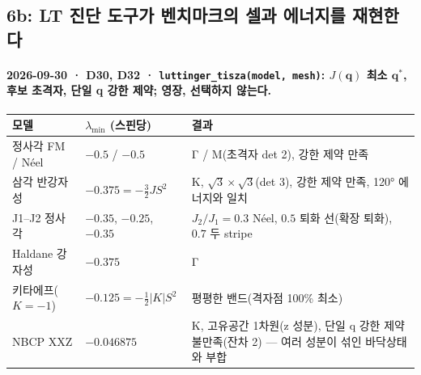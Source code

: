 \subsection{6b: LT 진단 도구가 벤치마크의 셀과 에너지를 재현한다}\label{stage6b}
\begingroup%
  \framesubtitle{2026-09-30 · D30, D32 · \texttt{luttinger\_tisza(model, mesh)}: $J(\mathbf q)$ 최소 $\mathbf q^*$, 후보 초격자, 단일 q 강한 제약; 영장, 선택하지 않는다.}
  \footnotesize\renewcommand{\arraystretch}{1.06}
  \begin{tabularx}{\textwidth}{@{}P{3.4cm}P{2.4cm}Y@{}}
    \toprule
    모델 & $\lambda_{\min}$ (스핀당) & 결과 \\
    \midrule
    정사각 FM / Néel & $-0.5$ / $-0.5$ & Γ / M(초격자 det 2), 강한 제약 만족 \\
    삼각 반강자성 & $-0.375=-\tfrac32JS^2$ & K, $\sqrt3\times\sqrt3$(det 3), 강한 제약 만족, 120° 에너지와 일치 \\
    J1--J2 정사각 & $-0.35$, $-0.25$, $-0.35$ & $J_2/J_1=0.3$ Néel, $0.5$ 퇴화 선(확장 퇴화), $0.7$ 두 stripe \\
    Haldane 강자성 & $-0.375$ & Γ \\
    키타에프($K=-1$) & $-0.125=-\tfrac12|K|S^2$ & 평평한 밴드(격자점 100\% 최소) \\
    NBCP XXZ & $-0.046875$ & K, 고유공간 1차원(z 성분), 단일 q 강한 제약 불만족(잔차 2) --- 여러 성분이 섞인 바닥상태와 부합 \\
    \bottomrule
  \end{tabularx}
  \par\smallskip
\endgroup


